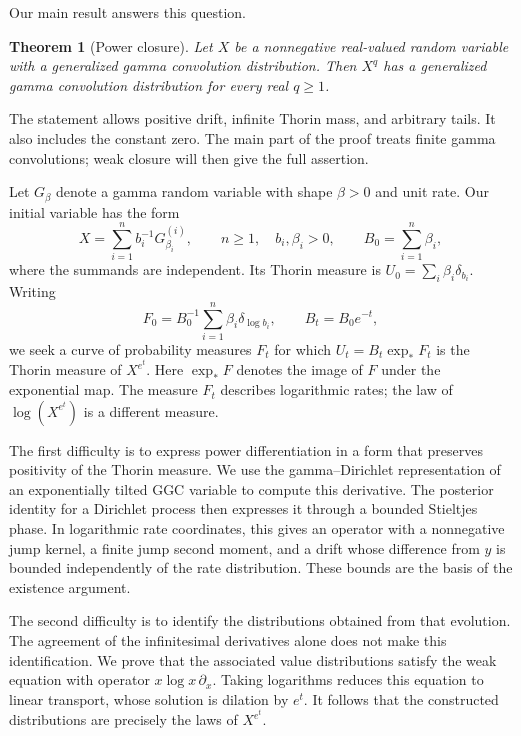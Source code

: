 \documentclass[11pt]{article}
\newtheorem{theorem}{Theorem}
\theoremstyle{definition}
\theoremstyle{remark}
\begin{document}
Our main result answers this question.

\begin{theorem}[Power closure]
\label{thm:main}
Let $X$ be a nonnegative real-valued random variable with a generalized gamma convolution distribution.
Then $X^q$ has a generalized gamma convolution distribution for every real $q\ge1$.
\end{theorem}

The statement allows positive drift, infinite Thorin mass, and arbitrary tails.
It also includes the constant zero.
The main part of the proof treats finite gamma convolutions; weak closure will then give the full assertion.

Let $G_\beta$ denote a gamma random variable with shape $\beta>0$ and unit rate.
Our initial variable has the form
\begin{equation}
 X=\sum_{i=1}^n b_i^{-1}G_{\beta_i}^{(i)},\qquad
 n\ge1,\quad b_i,\beta_i>0,\qquad B_0=\sum_{i=1}^n\beta_i,
 \label{eq:finite-input}
\end{equation}
where the summands are independent.
Its Thorin measure is $U_0=\sum_i\beta_i\delta_{b_i}$.
Writing
\[
 F_0=B_0^{-1}\sum_{i=1}^n\beta_i\delta_{\log b_i},\qquad
 B_t=B_0e^{-t},
\]
we seek a curve of probability measures $F_t$ for which $U_t=B_t\exp_*F_t$ is the Thorin measure of $X^{e^t}$.
Here $\exp_*F$ denotes the image of $F$ under the exponential map.
The measure $F_t$ describes logarithmic rates; the law of $\log(X^{e^t})$ is a different measure.

The first difficulty is to express power differentiation in a form that preserves positivity of the Thorin measure.
We use the gamma--Dirichlet representation of an exponentially tilted GGC variable to compute this derivative.
The posterior identity for a Dirichlet process then expresses it through a bounded Stieltjes phase.
In logarithmic rate coordinates, this gives an operator with a nonnegative jump kernel, a finite jump second moment, and a drift whose difference from $y$ is bounded independently of the rate distribution.
These bounds are the basis of the existence argument.

The second difficulty is to identify the distributions obtained from that evolution.
The agreement of the infinitesimal derivatives alone does not make this identification.
We prove that the associated value distributions satisfy the weak equation with operator $x\log x\,\partial_x$.
Taking logarithms reduces this equation to linear transport, whose solution is dilation by $e^t$.
It follows that the constructed distributions are precisely the laws of $X^{e^t}$.
\end{document}
